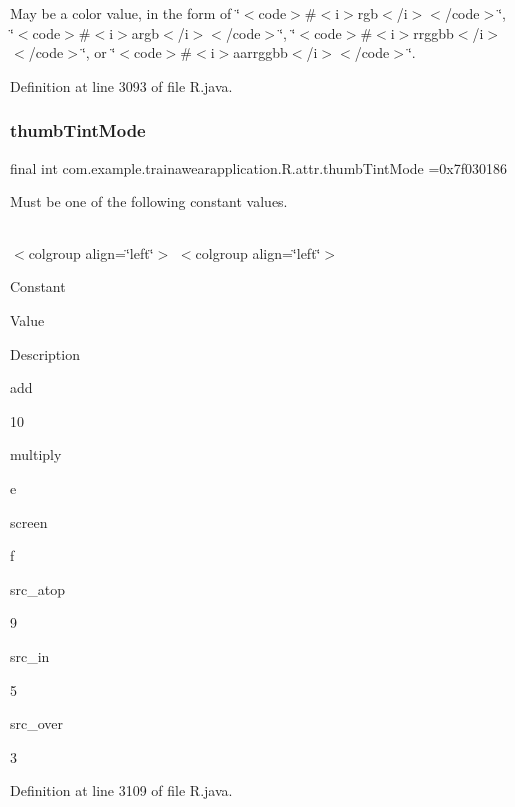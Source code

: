May be a color value, in the form of \char`\"{}$<$code$>$\#$<$i$>$rgb$<$/i$>$$<$/code$>$\char`\"{}, \char`\"{}$<$code$>$\#$<$i$>$argb$<$/i$>$$<$/code$>$\char`\"{}, \char`\"{}$<$code$>$\#$<$i$>$rrggbb$<$/i$>$$<$/code$>$\char`\"{}, or \char`\"{}$<$code$>$\#$<$i$>$aarrggbb$<$/i$>$$<$/code$>$\char`\"{}. 

Definition at line 3093 of file R.\+java.

\mbox{\label{classcom_1_1example_1_1trainawearapplication_1_1_r_1_1attr_ad235baed018e1101b3c089a8332da90c}} 
\subsubsection{\texorpdfstring{thumbTintMode}{thumbTintMode}}
{\footnotesize\ttfamily final int com.\+example.\+trainawearapplication.\+R.\+attr.\+thumb\+Tint\+Mode =0x7f030186\hspace{0.3cm}{\ttfamily [static]}}

Must be one of the following constant values.

\tabulinesep=1mm
\begin{longtabu}spread 0pt [c]{*{0}{|X[-1]}|}
\hline
\end{longtabu}
$<$colgroup align=\char`\"{}left\char`\"{}$>$ $<$colgroup align=\char`\"{}left\char`\"{}$>$ 

Constant

Value

Description 

add

10

multiply

e

screen

f

src\+\_\+atop

9

src\+\_\+in

5

src\+\_\+over

3

Definition at line 3109 of file R.\+java.

\mbox{\label{classcom_1_1example_1_1trainawearapplication_1_1_r_1_1attr_a24c7c233c39f72ce303b082f35d66c89}} 
